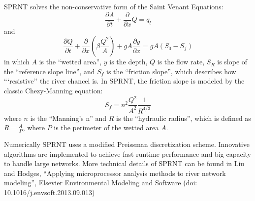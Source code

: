 \documentclass[10pt, letterpaper]{article}
\begin{document}
SPRNT solves the non-conservative form of the Saint Venant Equations:
\begin{equation}
\frac{\partial A}{\partial t} + \frac{\partial}{\partial x} Q = q_{l}
\label{eqn:mass}
\end{equation}
and
\begin{equation}
\frac{\partial Q}{\partial t} + \frac{\partial}{\partial x} \left( \beta \frac{Q^2}{A}
\right) + g A
\frac{\partial y}{\partial x} = g A (S_0 - S_f) 
\label{eqn:dynamic}
\end{equation}
in which $A$ is the ``wetted area'', $y$ is the depth, $Q$ is the flow rate, $S_R$ is slope
of the ``reference slope line'', and $S_f$ is the ``friction slope'', which describes how
```resistive'' the river chancel is. In SPRNT, the friction slope is modeled by the
classic Chezy-Manning equation:
\begin{equation}
S_f = n^2 \frac{Q^2}{A^2}\frac{1}{R^{4/3}}
\label{eqn:manning}
\end{equation}
where $n$ is the ``Manning's n'' and $R$ is the ``hydraulic radius'', which is defined as
$R=\frac{A}{P}$, where $P$ is the perimeter of the wetted area $A$.

Numerically SPRNT uses a modified Preissman discretization scheme. Innovative algorithms
are implemented to achieve fast runtime performance and big capacity to handle large
networks. More technical details of SPRNT can be found in Liu and Hodges, ``Applying
microprocessor analysis methods to river network modeling'', Elsevier Environmental
Modeling and Software (doi: 10.1016/j.envsoft.2013.09.013)
\end{document}
